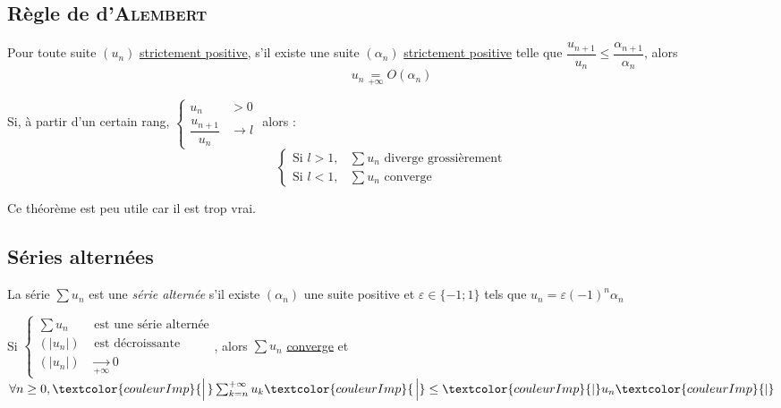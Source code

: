\documentclass[11pt,a4paper,fleqn,pdftex]{report}
\begin{document}
\subsection{Règle de d'\textsc{Alembert}} %
\label{sub:regle_de_d_alembert}
\begin{lemme}
    Pour toute suite $(u_n)$ \uline{strictement positive}, s'il existe une suite $(\alpha_n)$ \uline{strictement positive} telle que $\dfrac{u_{n+1}}{u_n}\le \dfrac{\alpha_{n+1}}{\alpha_n}$, alors 
    \begin{equation}
    u_n \underset{+\infty}{=} O(\alpha_n)
    \end{equation}
\end{lemme}
\begin{itheorem}\label{th:Regle_de_dAlembert}
    Si, à partir d'un certain rang, $\left\lbrace
    \begin{aligned}
        u_n &> 0    \\
        \dfrac{u_{n+1}}{u_n} &\to l
    \end{aligned}
    \right. $ alors :
    \begin{equation}
    \left\lbrace
    \begin{aligned}
        \text{Si } l >1, & \sum u_n \text{ diverge grossièrement}   \\
        \text{Si } l <1, & \sum u_n \text{ converge} 
    \end{aligned}
    \right.
    \end{equation}
\end{itheorem}
Ce théorème est peu utile car il est \og{}trop vrai\fg{}.
\subsection{Séries alternées} %
\label{sub:series_alternees}
\begin{dfn}
    La série $\sum u_n$ est une \emph{série alternée} s'il existe $(\alpha_n)$ une suite positive et $\varepsilon \in \lbrace -1 ; 1 \rbrace$ tels que $u_n = \varepsilon (-1)^n\alpha_n$
\end{dfn}
\begin{itheorem}
    Si $\left\lbrace \begin{aligned} \sum u_n &\text{ est une série alternée}\\ (|u_n|) &\text{ est décroissante} \\ (|u_n|) &\xrightarrow[+\infty]{} 0 \end{aligned}\right.$, alors $\sum u_n$ \uline{converge} et $\forall n \ge 0, \textcolor{couleurImp}{\left| \vphantom{\sum_{k=n}^{+\infty}} \right. } \sum_{k=n}^{+\infty}u_k \textcolor{couleurImp}{\left. \vphantom{\sum_{k=n}^{+\infty}} \right| } \le \textcolor{couleurImp}{|} u_n\textcolor{couleurImp}{|}$
\end{itheorem}
\end{document}
